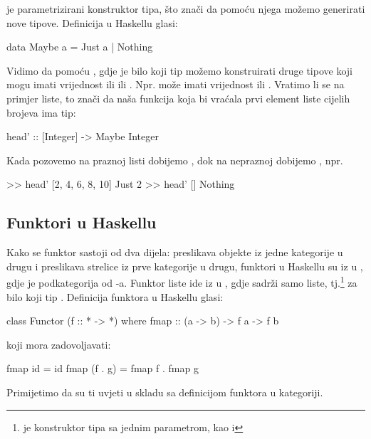    je parametrizirani konstruktor tipa, što znači da pomoću njega možemo generirati nove tipove. Definicija  u
  Haskellu glasi:
  \begin{mcode}
    data Maybe a = Just a | Nothing
  \end{mcode}
  Vidimo da pomoću , gdje je  bilo koji tip možemo
  konstruirati druge tipove koji mogu imati vrijednost ili  ili
  . Npr. može imati vrijednost  ili . Vratimo li se na primjer liste, to znači da naša funkcija
  koja bi vraćala prvi element liste cijelih brojeva ima tip:
  \begin{mcode}
    head' :: [Integer] -> Maybe Integer
  \end{mcode}
  Kada pozovemo  na praznoj listi dobijemo , dok na
  nepraznoj dobijemo , npr.
  \begin{mcode}
    >> head' [2, 4, 6, 8, 10]
    Just 2
    >> head' []
    Nothing
  \end{mcode}
  
  \subsection{Funktori u Haskellu}
  Kako se funktor sastoji od dva dijela: preslikava objekte iz jedne kategorije u drugu
  i preslikava strelice iz prve kategorije u drugu, funktori u Haskellu su iz
   u , gdje je  podkategorija od
  -a. Funktor liste ide iz  u ,
  gdje  sadrži samo liste, tj.\codei{[T]}\footnote{
    \codei{[a]} je konstruktor tipa sa jednim parametrom,
    kao i }
  za bilo koji tip . Definicija funktora u Haskellu glasi:
  \begin{mcode}
    class Functor (f :: * -> *) where
      fmap :: (a -> b) -> f a -> f b
  \end{mcode}
  koji mora zadovoljavati:
  \begin{mcode}
    fmap id = id
    fmap (f . g) = fmap f . fmap g
  \end{mcode}
  Primijetimo da su ti uvjeti u skladu sa definicijom funktora u kategoriji.\\
  

